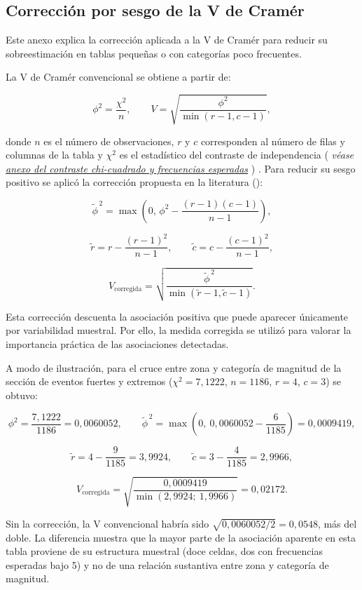 \documentclass[
  spanish,
  letterpaper,
  DIV=11,
  numbers=noendperiod]{scrartcl}
\newcommand{\asesoriaParenRef}[1]{%
  \textnormal{\textcolor{asesoriaTextColor}{(}}%
  {\hypersetup{linkcolor=asesoriaLinkColor,urlcolor=asesoriaLinkColor,citecolor=asesoriaLinkColor}\textcolor{asesoriaTextColor}{\emph{#1}}}%
  \textnormal{\textcolor{asesoriaTextColor}{)}}%
}
\begin{document}
\subsection{Corrección por sesgo de la V de
Cramér}\label{sec-anexo-cramer}

Este anexo explica la corrección aplicada a la V de Cramér para reducir
su sobreestimación en tablas pequeñas o con categorías poco frecuentes.

La V de Cramér convencional se obtiene a partir de:

\[
\phi^2=\frac{\chi^2}{n},
\qquad
V=\sqrt{\frac{\phi^2}{\min(r-1,c-1)}},
\]

donde \(n\) es el número de observaciones, \(r\) y \(c\) corresponden al
número de filas y columnas de la tabla y \(\chi^2\) es el estadístico
del contraste de independencia
\asesoriaParenRef{véase \hyperref[sec-anexo-chi-esperadas]{anexo del contraste chi-cuadrado y frecuencias esperadas}}.
Para reducir su sesgo positivo se aplicó la corrección propuesta en la
literatura ():

\[
\widetilde{\phi}^{\,2}
=\max\left(
0,\,
\phi^2-\frac{(r-1)(c-1)}{n-1}
\right),
\]

\[
\widetilde r=r-\frac{(r-1)^2}{n-1},
\qquad
\widetilde c=c-\frac{(c-1)^2}{n-1},
\]

\[
V_{\mathrm{corregida}}
=\sqrt{
\frac{\widetilde{\phi}^{\,2}}
{\min(\widetilde r-1,\widetilde c-1)}
}.
\]

Esta corrección descuenta la asociación positiva que puede aparecer
únicamente por variabilidad muestral. Por ello, la medida corregida se
utilizó para valorar la importancia práctica de las asociaciones
detectadas.

A modo de ilustración, para el cruce entre zona y categoría de magnitud
de la sección de eventos fuertes y extremos (\(\chi^2=7{,}1222\),
\(n=1186\), \(r=4\), \(c=3\)) se obtuvo:

\[
\phi^2=\frac{7{,}1222}{1186}=0{,}0060052,
\qquad
\widetilde{\phi}^{\,2}=\max\left(0,\ 0{,}0060052-\frac{6}{1185}\right)=0{,}0009419,
\]

\[
\widetilde r=4-\frac{9}{1185}=3{,}9924,
\qquad
\widetilde c=3-\frac{4}{1185}=2{,}9966,
\]

\[
V_{\mathrm{corregida}}=\sqrt{\frac{0{,}0009419}{\min(2{,}9924;\ 1{,}9966)}}=0{,}02172.
\]

Sin la corrección, la V convencional habría sido
\(\sqrt{0{,}0060052/2}=0{,}0548\), más del doble. La diferencia muestra
que la mayor parte de la asociación aparente en esta tabla proviene de
su estructura muestral (doce celdas, dos con frecuencias esperadas bajo
5) y no de una relación sustantiva entre zona y categoría de magnitud.
\end{document}
